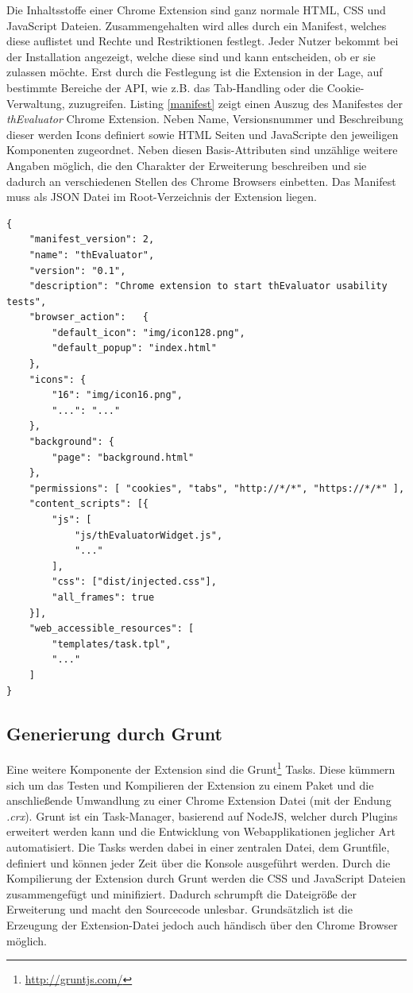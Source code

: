 Die Inhaltsstoffe einer Chrome Extension sind ganz normale HTML, CSS und JavaScript Dateien. Zusammengehalten wird alles durch ein Manifest, welches diese auflistet und Rechte und Restriktionen festlegt. Jeder Nutzer bekommt bei der Installation angezeigt, welche diese sind und kann entscheiden, ob er sie zulassen möchte. Erst durch die Festlegung ist die Extension in der Lage, auf bestimmte Bereiche der API, wie z.B. das Tab-Handling oder die Cookie-Verwaltung, zuzugreifen. Listing \ref{manifest} zeigt einen Auszug des Manifestes der \textit{thEvaluator} Chrome Extension. Neben Name, Versionsnummer und Beschreibung dieser werden Icons definiert sowie HTML Seiten und JavaScripte den jeweiligen Komponenten zugeordnet. Neben diesen Basis-Attributen sind unzählige weitere Angaben möglich, die den Charakter der Erweiterung beschreiben und sie dadurch an verschiedenen Stellen des Chrome Browsers einbetten. Das Manifest muss als JSON Datei im Root-Verzeichnis der Extension liegen.
\\
\begin{lstlisting}[caption=Auszug aus der Manifest.json der \textit{thEvaluator} Extension,label=manifest]
{
    "manifest_version": 2,
    "name": "thEvaluator",
    "version": "0.1",
    "description": "Chrome extension to start thEvaluator usability tests",
    "browser_action":   {
        "default_icon": "img/icon128.png",
        "default_popup": "index.html"
    },
    "icons": { 
        "16": "img/icon16.png",
        "...": "..."
    },
    "background": {
        "page": "background.html"
    },
    "permissions": [ "cookies", "tabs", "http://*/*", "https://*/*" ],
    "content_scripts": [{
        "js": [
            "js/thEvaluatorWidget.js",
            "..."
        ],
        "css": ["dist/injected.css"],
        "all_frames": true
    }],
    "web_accessible_resources": [
        "templates/task.tpl",
        "..."
    ]
}
\end{lstlisting}

\subsection{Generierung durch Grunt}

Eine weitere Komponente der Extension sind die Grunt\footnote{\url{http://gruntjs.com/}} Tasks. Diese kümmern sich um das Testen und Kompilieren der Extension zu einem Paket und die anschließende Umwandlung zu einer Chrome Extension Datei (mit der Endung \textit{.crx}). Grunt ist ein Task-Manager, basierend auf NodeJS, welcher durch Plugins erweitert werden kann und die Entwicklung von Webapplikationen jeglicher Art automatisiert. Die Tasks werden dabei in einer zentralen Datei, dem Gruntfile, definiert und können jeder Zeit über die Konsole ausgeführt werden. Durch die Kompilierung der Extension durch Grunt werden die CSS und JavaScript Dateien zusammengefügt und minifiziert. Dadurch schrumpft die Dateigröße der Erweiterung und macht den Sourcecode unlesbar. Grundsätzlich ist die Erzeugung der Extension-Datei jedoch auch händisch über den Chrome Browser möglich.

